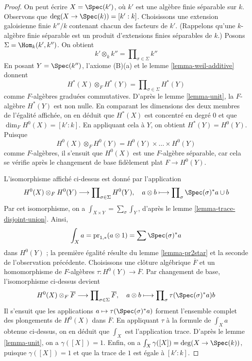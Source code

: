 \begin{proof}
On peut écrire $X = \Spec(k')$, où $k'$ est une algèbre finie séparable
sur $k$. Observons que $\deg(X \to \Spec(k)) = [k' : k]$.
Choisissons une extension galoisienne finie $k''/k$ contenant chacun des
facteurs de $k'$. (Rappelons qu'une $k$-algèbre finie séparable est
un produit d'extensions finies séparables de $k$.)
Posons $\Sigma = \Hom_k(k', k'')$. On obtient
$$
k' \otimes_k k'' = \prod\nolimits_{\sigma \in \Sigma} k''
$$
En posant $Y = \Spec(k'')$, l'axiome (B)(a) et le lemme \ref{lemma-weil-additive} donnent
$$
H^*(X) \otimes_F H^*(Y) =
\prod\nolimits_{\sigma \in \Sigma} H^*(Y)
$$
comme $F$-algèbres graduées commutatives. D'après le lemme \ref{lemma-unit},
la $F$-algèbre $H^*(Y)$ est non nulle. En comparant les dimensions des deux membres
de l'égalité affichée, on en déduit que $H^*(X)$ est concentré en degré $0$
et que $\dim_F H^0(X) = [k' : k]$. En appliquant cela à $Y$, on obtient
$H^*(Y) = H^0(Y)$. Puisque
$$
H^0(X) \otimes_F H^0(Y) = H^0(Y) \times \ldots \times H^0(Y)
$$
comme $F$-algèbres, il s'ensuit que $H^0(X)$ est une $F$-algèbre séparable,
car cela se vérifie après le changement de base fidèlement plat
$F \to H^0(Y)$.

\medskip\noindent
L'isomorphisme affiché ci-dessus est donné par l'application
$$
H^0(X) \otimes_F H^0(Y) \longrightarrow
\prod\nolimits_{\sigma \in \Sigma} H^0(Y),\quad
a \otimes b \longmapsto \prod\nolimits_\sigma \Spec(\sigma)^*a \cup b
$$
Par cet isomorphisme, on a $\int_{X \times Y} = \sum_\sigma \int_Y$, d'après
le lemme \ref{lemma-trace-disjoint-union}. Ainsi,
$$
\int_X a = \text{pr}_{1, *}(a \otimes 1) = \sum \Spec(\sigma)^*a
$$
dans $H^0(Y)$ ; la première égalité résulte du lemme \ref{lemma-pr2star}
et la seconde de l'observation précédente. Choisissons une
clôture algébrique $\overline{F}$ et
un homomorphisme de $F$-algèbres $\tau : H^0(Y) \to \overline{F}$.
Par changement de base, l'isomorphisme ci-dessus devient
$$
H^0(X) \otimes_F \overline{F} \longrightarrow
\prod\nolimits_{\sigma \in \Sigma} \overline{F},\quad
a \otimes b \longmapsto \prod\nolimits_\sigma \tau(\Spec(\sigma)^*a) b
$$
Il s'ensuit que les applications $a \mapsto \tau(\Spec(\sigma)^*a)$ forment l'ensemble complet
des plongements de $H^0(X)$ dans $\overline{F}$. En appliquant $\tau$
à la formule de $\int_X a$ obtenue ci-dessus, on en déduit
que $\int_X$ est l'application trace.
D'après le lemme \ref{lemma-unit}, on a $\gamma([X]) = 1$.
Enfin, on a $\int_X \gamma([X]) = \deg(X \to \Spec(k))$,
puisque $\gamma([X]) = 1$ et que la trace de $1$ est égale à $[k' : k]$.
\end{proof}

